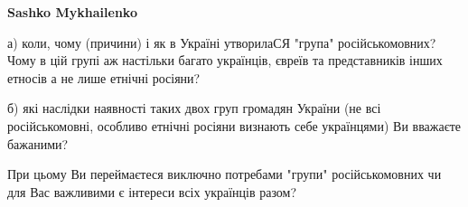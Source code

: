 \begin{itemize}
\begin{itemize}
\textbf{Sashko Mykhailenko}

а) коли, чому (причини) і як в Україні утворилаСЯ "група" російськомовних? Чому
в цій групі аж настільки багато українців, євреїв та представників інших
етносів а не лише етнічні росіяни?

б) які наслідки наявності таких двох груп громадян України (не всі
російськомовні, особливо етнічні росіяни визнають себе українцями) Ви вважаєте
бажаними?

При цьому Ви переймаєтеся виключно потребами "групи" російськомовних чи для Вас
важливими є інтереси всіх українців разом?

\end{itemize} %

\end{itemize} %

